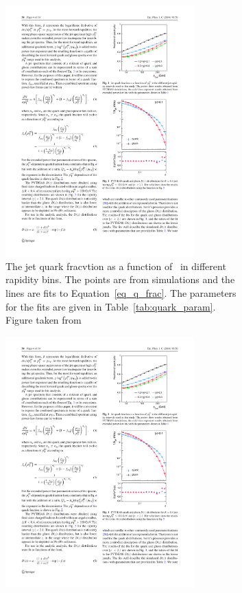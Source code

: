 \begin{figure}
\begin{subfigure}{.45\textwidth}
  \centering
\includegraphics[width=0.8\textwidth]{figures/jetMeasurements/jetQuarkFraction}
\caption{The jet quark fracvtion as a function of \ptjet\ in different rapidity bins. The points are from  simulations and the lines are fits to Equation~\ref{eq_q_frac}. The parameters for the fits are given in Table~\ref{tab:quark_param}. Figure taken from \cite{Spousta:2015fca}}
\label{fig:raa_centDep}
\end{subfigure} \qquad
\begin{subfigure}{.45\textwidth}
  \centering
\includegraphics[width=0.8\textwidth]{figures/jetMeasurements/gluon_fragmentation}

\end{subfigure}
\end{figure}
